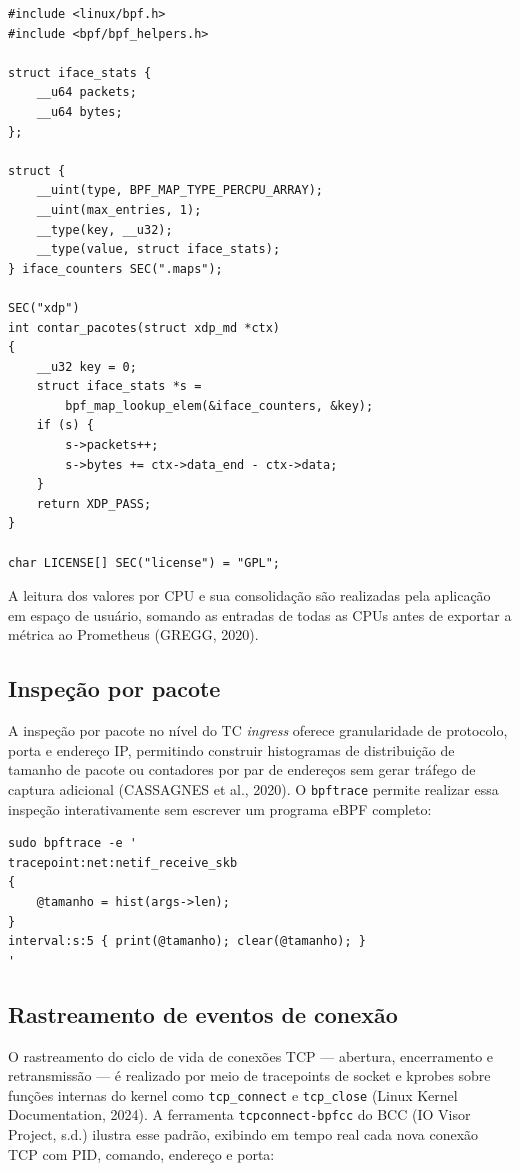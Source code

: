 \begin{lstlisting}[caption={Contadores de pacotes e bytes por interface com XDP.}, label=lst:obs-iface]
#include <linux/bpf.h>
#include <bpf/bpf_helpers.h>

struct iface_stats {
    __u64 packets;
    __u64 bytes;
};

struct {
    __uint(type, BPF_MAP_TYPE_PERCPU_ARRAY);
    __uint(max_entries, 1);
    __type(key, __u32);
    __type(value, struct iface_stats);
} iface_counters SEC(".maps");

SEC("xdp")
int contar_pacotes(struct xdp_md *ctx)
{
    __u32 key = 0;
    struct iface_stats *s =
        bpf_map_lookup_elem(&iface_counters, &key);
    if (s) {
        s->packets++;
        s->bytes += ctx->data_end - ctx->data;
    }
    return XDP_PASS;
}

char LICENSE[] SEC("license") = "GPL";
\end{lstlisting}

A leitura dos valores por CPU e sua consolidação são realizadas pela aplicação em
espaço de usuário, somando as entradas de todas as CPUs antes de exportar a métrica
ao Prometheus (GREGG, 2020).

\subsection*{Inspeção por pacote}

A inspeção por pacote no nível do TC \textit{ingress} oferece granularidade de
protocolo, porta e endereço IP, permitindo construir histogramas de distribuição de
tamanho de pacote ou contadores por par de endereços sem gerar tráfego de captura
adicional (CASSAGNES et al., 2020). O \texttt{bpftrace} permite realizar essa inspeção
interativamente sem escrever um programa eBPF completo:

\begin{lstlisting}[caption={Histograma de tamanho de pacotes TCP com bpftrace.}, label=lst:obs-pkt-hist]
sudo bpftrace -e '
tracepoint:net:netif_receive_skb
{
    @tamanho = hist(args->len);
}
interval:s:5 { print(@tamanho); clear(@tamanho); }
'
\end{lstlisting}

\subsection*{Rastreamento de eventos de conexão}

O rastreamento do ciclo de vida de conexões TCP — abertura, encerramento e
retransmissão — é realizado por meio de tracepoints de socket e kprobes sobre funções
internas do kernel como \texttt{tcp\_connect} e \texttt{tcp\_close} (Linux Kernel
Documentation, 2024). A ferramenta \texttt{tcpconnect-bpfcc} do BCC (IO Visor
Project, s.d.) ilustra esse padrão, exibindo em tempo real cada nova conexão TCP com
PID, comando, endereço e porta:

